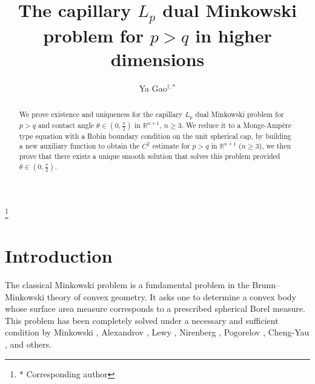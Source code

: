 \documentclass[11pt]{amsart}
\def\R{{\mathfrak R}}
\def\R{\mathbb R}
\numberwithin{equation} {section}
\numberwithin{equation}{section}
\begin{document}
\title[The capillary $L_p$ dual Minkowski problem]
 {The capillary $L_p$ dual Minkowski problem for $p>q$ in higher dimensions}

\author{ Ya Gao$^{\dagger,\ast}$}

\address{
 $^{\dagger}$School of Mathematics and Statistics, South-Central Minzu University, Wuhan 430074, China. }


\thanks{$\ast$ Corresponding author}

\date{}
\begin{abstract}
We prove existence and uniqueness for the capillary $L_p$ dual Minkowski problem for $p>q$ and contact angle $\theta\in (0,\frac{\pi}{2})$ in $\R^{n+1}$, $n\geq 3$. We reduce it to a Monge-Amp\`ere type equation with a Robin boundary condition on the unit spherical cap, by building a new auxiliary function to obtain the $C^2$ estimate for $p>q$ in $\R^{n+1}$ ($n\geq 3$), we then prove that there exists a unique smooth solution that solves this problem provided $\theta\in (0, \frac{\pi}{2})$.
\end{abstract}






\section{Introduction}
The classical Minkowski problem is a fundamental problem in the Brunn--Minkowski theory of convex geometry. It asks one to determine a convex body whose surface area measure corresponds to a prescribed spherical Borel measure. This problem has been completely solved under a necessary and sufficient condition by Minkowski \cite{Min97, Min03}, Alexandrov \cite{Ale38, Ale39, Ale56}, Lewy \cite{Lew38}, Nirenberg \cite{Nir53}, Pogorelov \cite{Pog52}, Cheng-Yau \cite{CY76}, and others. 
\end{document}
